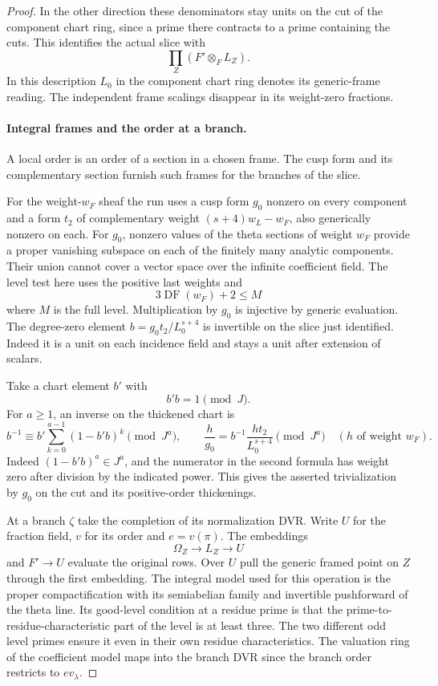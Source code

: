 \begin{proof}
In the other direction these denominators stay units on the cut
of the component chart ring, since a prime there contracts to a
prime containing the cuts. This identifies the actual slice with
\[
                   \prod_Z (F'\otimes_F L_Z).
\]
In this description \(L_0\) in the component chart ring denotes
its generic-frame reading. The independent frame scalings disappear
in its weight-zero fractions.

\paragraph{Integral frames and the order at a branch.}

A local order is an order of a section in a chosen frame. The cusp form and its complementary section furnish such frames for the branches of the slice.

For the weight-\(w_F\) sheaf the run uses a cusp form \(g_0\)
nonzero on every component and a form \(t_2\) of complementary
weight \((s+4)w_L-w_F\), also generically nonzero on each.
For \(g_0\), nonzero values of the theta sections of weight \(w_F\) provide
a proper vanishing subspace on each of the finitely many analytic
components. Their union cannot cover a vector space over the
infinite coefficient field. The level test here uses the positive
last weights and 
\[
  3\operatorname{DF}(w_F)+2\le M
\]
 where \(M\)
is the full level. Multiplication by \(g_0\) is injective by generic
evaluation. The degree-zero element
\(b=g_0t_2/L_0^{s+4}\) is invertible on the slice just identified.
Indeed it is a unit on each incidence field and stays a unit after
extension of scalars.

Take a chart element \(b'\) with 
\[
  b'b=1\pmod J.
\]
 For
\(a\ge1\), an inverse on the thickened chart is
\[
    b^{-1}\equiv b'\sum_{k=0}^{a-1}(1-b'b)^k\pmod{J^a},
 \qquad
 \frac{h}{g_0}
  =b^{-1}\frac{h t_2}{L_0^{s+4}}\pmod{J^a}
       \quad(h\text{ of weight }w_F).
\]
Indeed \((1-b'b)^a\in J^a\), and the numerator in the second
formula has weight zero after division by the indicated power.
This gives the asserted trivialization by \(g_0\) on the cut
and its positive-order thickenings.

At a branch \(\zeta\) take the completion of its normalization
DVR. Write \(U\) for the fraction field, \(v\) for its order
and \(e=v(\pi)\). The embeddings 
\[
  \Omega_Z\to L_Z\to U
\]
and \(F'\to U\) evaluate the original rows. Over \(U\) pull
the generic framed point on \(Z\) through the first embedding.
The integral model used for this operation is the proper
compactification with its semiabelian family and invertible
pushforward of the theta line. Its good-level condition at a
residue prime is that the prime-to-residue-characteristic part
of the level is at least three. The two different odd level
primes ensure it even in their own residue characteristics.
The valuation ring of the coefficient model maps into the
branch DVR since the branch order restricts to \(e v_\lambda\).


\end{proof}
